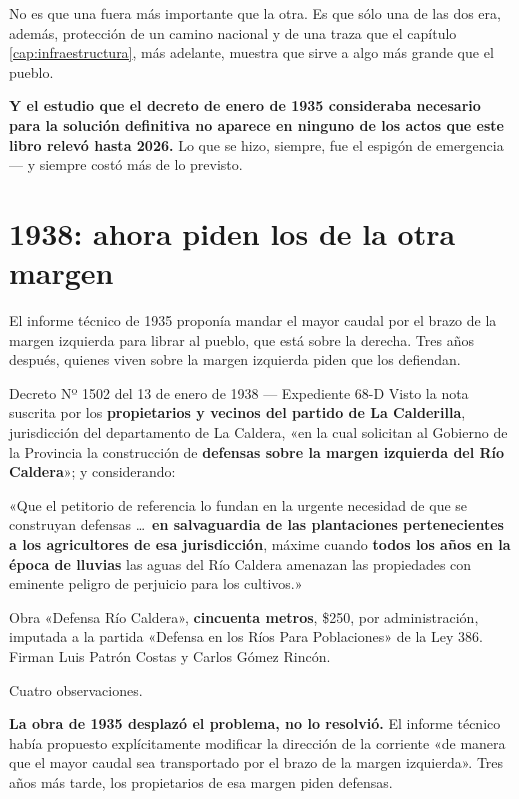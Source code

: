 No es que una fuera más importante que la otra. Es que sólo una de las dos era, además,
protección de un camino nacional y de una traza que el capítulo \ref{cap:infraestructura}, más adelante, muestra que sirve a algo
más grande que el pueblo.

\textbf{Y el estudio que el decreto de enero de 1935 consideraba necesario para la solución
definitiva no aparece en ninguno de los actos que este libro relevó hasta 2026.} Lo que se hizo, siempre, fue el
espigón de emergencia --- y siempre costó más de lo previsto.

\section{1938: ahora piden los de la otra margen}

El informe técnico de 1935 proponía mandar el mayor caudal por el brazo de la margen
izquierda para librar al pueblo, que está sobre la derecha. Tres años después, quienes viven
sobre la margen izquierda piden que los defiendan.

\begin{ficha}{Decreto Nº 1502 del 13 de enero de 1938 --- Expediente 68-D}
Visto la nota suscrita por los \textbf{propietarios y vecinos del partido de La Calderilla},
jurisdicción del departamento de La Caldera, «en la cual solicitan al Gobierno de la
Provincia la construcción de \textbf{defensas sobre la margen izquierda del Río Caldera}»; y
considerando:

«Que el petitorio de referencia lo fundan en la urgente necesidad de que se construyan
defensas \ldots\ \textbf{en salvaguardia de las plantaciones pertenecientes a los
agricultores de esa jurisdicción}, máxime cuando \textbf{todos los años en la época de
lluvias} las aguas del Río Caldera amenazan las propiedades con eminente peligro de perjuicio
para los cultivos.»

Obra «Defensa Río Caldera», \textbf{cincuenta metros}, \$250, por administración, imputada a
la partida «Defensa en los Ríos Para Poblaciones» de la Ley 386. Firman Luis Patrón Costas y
Carlos Gómez Rincón.
\end{ficha}

Cuatro observaciones.

\textbf{La obra de 1935 desplazó el problema, no lo resolvió.} El informe técnico había
propuesto explícitamente modificar la dirección de la corriente «de manera que el mayor caudal
sea transportado por el brazo de la margen izquierda». Tres años más tarde, los propietarios
de esa margen piden defensas.

